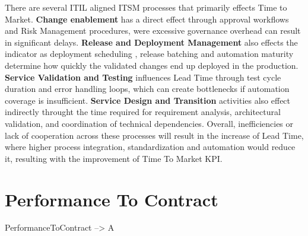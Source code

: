 There are several ITIL aligned ITSM processes that primarily effects Time to Market. \textbf{Change enablement} has a direct effect through approval workflows and Risk Management procedures, were excessive governance overhead can result in significant delays. \textbf{Release and Deployment Management} also effects the indicator  as deployment scheduling , release batching and automation maturity determine how quickly the validated changes end up deployed in the production. \textbf{Service Validation and Testing} influences Lead Time through test cycle duration and error handling loops, which can create bottlenecks if automation coverage is insufficient. \textbf{Service Design and Transition} activities also effect indirectly throught the time required for requirement analysis, architectural validation, and coordination of technical dependencies. Overall, inefficiencies or lack of cooperation across these processes will result in the increase of Lead Time, where higher process integration, standardization and automation would reduce it, resulting with the improvement of Time To Market KPI.



\section{Performance To Contract}
PerformanceToContract --> A